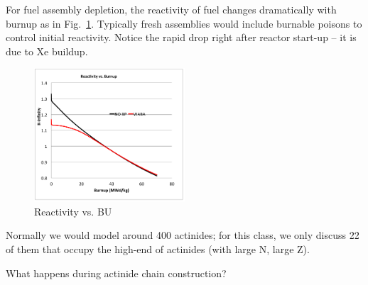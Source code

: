 \documentclass{school-22.211-notes}
\date{April 11, 2012}
\begin{document}
\maketitle

 \label{fuel-depletion} For fuel assembly
depletion, the reactivity of fuel changes dramatically with burnup as
in Fig.~\ref{rho-vs-BU}. Typically fresh assemblies would include
burnable poisons to control initial reactivity. Notice the rapid drop
right after reactor start-up -- it is due to Xe buildup.

\begin{figure}[h]
  \centering
  \includegraphics[width=0.5\textwidth]{images/dfs/rho-vs-BU.png}
  \caption{Reactivity vs. BU} \label{rho-vs-BU}
\end{figure}


Normally we would model around 400 actinides; for this class, we only
discuss 22 of them that occupy the high-end of actinides (with large
N, large Z).


What happens during actinide chain construction?
\end{document}
